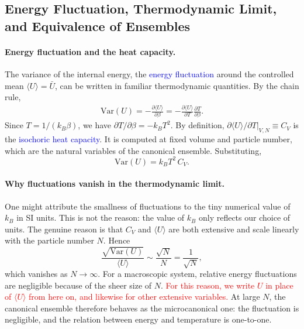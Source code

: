 \subsection{Energy Fluctuation, Thermodynamic Limit, and Equivalence of Ensembles}

\paragraph{Energy fluctuation and the heat capacity.}
The variance of the internal energy, the \textcolor{blue}{energy
fluctuation} around the controlled mean $\langle U\rangle=\bar U$, can be
written in familiar thermodynamic quantities. By the chain rule,
\begin{align*}
    \mathrm{Var}(U)
    = -\frac{\partial\langle U\rangle}{\partial\beta}
    = -\frac{\partial\langle U\rangle}{\partial T}\frac{\partial T}{\partial\beta}.
\end{align*}
Since $T=1/(k_B\beta)$, we have $\partial T/\partial\beta=-k_BT^2$. By
definition, $\left.\partial\langle U\rangle/\partial T\right|_{V,N}\equiv C_V$
is the \textcolor{blue}{isochoric heat capacity}. It is computed at fixed
volume and particle number, which are the natural variables of the canonical
ensemble. Substituting,
\begin{equation}
    \boxed{\mathrm{Var}(U) = k_B T^2\, C_V.}
\end{equation}

\paragraph{Why fluctuations vanish in the thermodynamic limit.}
One might attribute the smallness of fluctuations to the tiny numerical
value of $k_B$ in SI units. This is not the reason: the value of $k_B$ only
reflects our choice of units. The genuine reason is that $C_V$ and
$\langle U\rangle$ are both extensive and scale linearly with the particle
number $N$. Hence
\begin{equation}
    \boxed{\frac{\sqrt{\mathrm{Var}(U)}}{\langle U\rangle}
    \sim\frac{\sqrt{N}}{N}=\frac{1}{\sqrt{N}},}
\end{equation}
which vanishes as $N\to\infty$. For a macroscopic system, relative energy
fluctuations are negligible because of the sheer size of $N$.
\textcolor{red}{For this reason, we write $U$ in place of $\langle U\rangle$
from here on, and likewise for other extensive variables.}
At large $N$, the canonical ensemble therefore behaves as the microcanonical
one: the fluctuation is negligible, and the relation between energy and
temperature is one-to-one.

